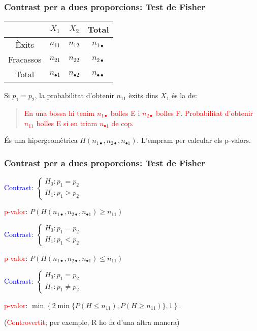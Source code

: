 \documentclass[12pt,t]{beamer}\usepackage[]{graphicx}\usepackage[]{color}
\newcommand{\red}[1]{\textcolor{red}{#1}}
\newcommand{\blue}[1]{\textcolor{blue}{#1}}
\renewcommand{\leq}{\leqslant}
\renewcommand{\geq}{\geqslant}
\theoremstyle{plain}
\theoremstyle{definition}
\begin{document}
\begin{frame}
\frametitle{Contrast per a dues proporcions: Test de Fisher}
\vspace*{-2ex}

\begin{center}
\begin{tabular}{c|cc|c|}
  & $X_1$ & $X_2$ &  Total\\\hline
Èxits & $n_{11}$ & $n_{12}$ &  $n_{1\bullet}$\\
Fracassos & $n_{21}$ & $n_{22}$ &  $n_{2\bullet}$ \\\hline 
Total & $n_{\bullet1}$ & $n_{\bullet2}$ & $n_{\bullet\bullet}$
\\\hline
\end{tabular}
\end{center}
\medskip

Si $p_1=p_2$, la probabilitat d'obtenir $n_{11}$ èxits dins $X_1$ és la de:
\begin{quote}
\red{En una bossa hi tenim $n_{1\bullet}$ bolles E i $n_{2\bullet}$ bolles F. Probabilitat d'obtenir $n_{11}$ bolles E si en triam $n_{\bullet1}$ de cop.}
\end{quote}
És una hipergeomètrica $H(n_{1\bullet},n_{2\bullet},n_{\bullet1})$. L'empram per calcular els p-valors.

\end{frame}

\begin{frame}
\frametitle{Contrast per a dues proporcions: Test de Fisher}

\blue{Contrast:}
$
\left\{\begin{array}{l}
H_0:p_1=p_2\\
H_1:p_1> p_2
\end{array}\right.
$
\medskip

\red{p-valor}: $P(H(n_{1\bullet},n_{2\bullet},n_{\bullet1})\geq n_{11})$
\bigskip

\blue{Contrast:}
$
\left\{\begin{array}{l}
H_0:p_1=p_2\\
H_1:p_1< p_2
\end{array}\right.
$
\medskip

\red{p-valor}: $P(H(n_{1\bullet},n_{2\bullet},n_{\bullet1})\leq n_{11})$
\bigskip

\blue{Contrast:}
$
\left\{\begin{array}{l}
H_0:p_1=p_2\\
H_1:p_1\neq  p_2
\end{array}\right.
$
\medskip

\red{p-valor}: $\min\left\{2\min\{P(H\leq n_{11}), P(H\geq n_{11})\},1\right\}$.
\medskip
 
(\red{Controvertit}; per exemple, R ho fa d'una altra manera)

\bigskip





\end{frame}
\end{document}
